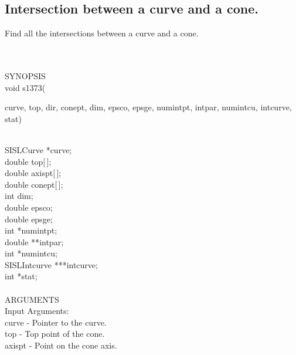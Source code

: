 \subsection{Intersection between a curve and a cone.} \label{sec:s1373}
\begin{minipg1}
  Find all the intersections between a curve and a cone.
\end{minipg1} \\ \\
SYNOPSIS\\
        \>void s1373(\begin{minipg3}
         {\fov curve}, {\fov top}, {\fov dir}, {\fov conept}, {\fov dim}, {\fov epsco}, {\fov epsge}, {\fov numintpt}, {\fov intpar},
                        {\fov numintcu}, {\fov intcurve}, {\fov stat})
                \end{minipg3}\\[0.3ex]
                \>\>    SISLCurve       \>      *{\fov curve};\\
                \>\>    double  \>      {\fov top}[\,];\\
                \>\>    double  \>      {\fov axispt}[\,];\\
                \>\>    double  \>      {\fov conept}[\,];\\
                \>\>    int     \>      {\fov dim};\\
                \>\>    double  \>      {\fov epsco};\\
                \>\>    double  \>      {\fov epsge};\\
                \>\>    int     \>      *{\fov numintpt};\\
                \>\>    double  \>      **{\fov intpar};\\
                \>\>    int     \>      *{\fov numintcu};\\
                \>\>    SISLIntcurve \> ***{\fov intcurve};\\
                \>\>    int     \>      *{\fov stat};\\
\\
ARGUMENTS\\
        \>Input Arguments:\\
        \>\>    {\fov curve}    \> - \> Pointer to the curve.\\
        \>\>    {\fov top}      \> - \> Top point of the cone.\\
        \>\>    {\fov axispt}   \> - \> Point on the cone axis.\\

